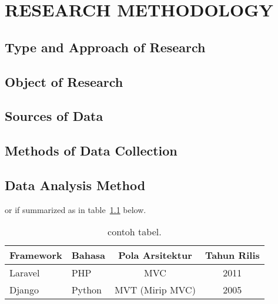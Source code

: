 \chapter{RESEARCH METHODOLOGY}
	\section{Type and Approach of Research}
	\setlength{\leftskip}{0.7cm}
	\lipsum[3]		
	\section{Object of Research}
	\lipsum[3]
	\section{Sources of Data}
	\lipsum[3]
	\section{Methods of Data Collection}
	\lipsum[3]
	\section{Data Analysis Method}	
	\lipsum[3]
	or if summarized as in table~\ref{tab:contoh-t} below.
	
	\begin{table}[h!]
		\centering
		\caption{contoh tabel.}
		\label{tab:contoh-t}
		\begin{tabular}{llcc}
			\toprule
			\textbf{Framework} & \textbf{Bahasa} & \textbf{Pola Arsitektur} & \textbf{Tahun Rilis} \\
			\midrule
			Laravel & PHP & MVC & 2011 \\
			Django & Python & MVT (Mirip MVC) & 2005 \\
			\bottomrule
		\end{tabular}
	\end{table}